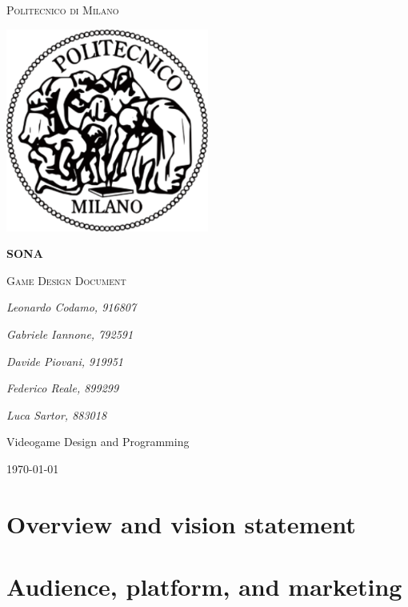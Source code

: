 \documentclass[15pt, a4paperm, hidelinks]{article}
\begin{document}
	\begin{titlepage}
	\centering
	{\scshape\huge Politecnico di Milano\par}
	\vspace{1.5cm}
	\includegraphics[width=0.50\textwidth]{Images/logoFronte.pdf}\par
	\vspace{1.5cm}
	{\Huge\bfseries SONA\par}
	\vspace{0.5cm}
	{\scshape\LARGE Game Design Document\par}
	\vspace{2cm}
	{\LARGE\itshape Leonardo Codamo, 916807\par}
	{\LARGE\itshape Gabriele Iannone, 792591\par}
	{\LARGE\itshape Davide Piovani, 919951\par}
	{\LARGE\itshape Federico Reale, 899299\par}
	{\LARGE\itshape Luca Sartor, 883018\par}
	\vfill \vfill
	{\Large Videogame Design and Programming\par}
	\vfill
	{\large \today\par}
\end{titlepage}

\tableofcontents
\clearpage

\section{Overview and vision statement}


\bigskip

\section{Audience, platform, and marketing}

\clearpage
\end{document}
